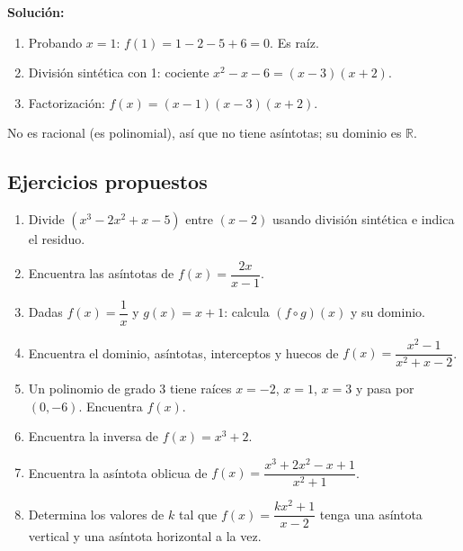 \documentclass[12pt, a4paper]{article}
\begin{document}
\begin{cuadrosolucion}
  \textbf{Solución:}
  \begin{enumerate}
    \item Probando $x = 1$: $f(1) = 1 - 2 - 5 + 6 = 0$. Es raíz.
    \item División sintética con 1: cociente $x^2 - x - 6 = (x - 3)(x + 2)$.
    \item Factorización: $f(x) = (x - 1)(x - 3)(x + 2)$.
  \end{enumerate}
  No es racional (es polinomial), así que no tiene asíntotas; su dominio es $\mathbb{R}$.
\end{cuadrosolucion}

\subsection{Ejercicios propuestos}

\begin{enumerate}[leftmargin=*, resume]
  \item \facil{} Divide $(x^3 - 2x^2 + x - 5)$ entre $(x - 2)$ usando división sintética e indica el residuo.

  \item \facil{} Encuentra las asíntotas de $f(x) = \dfrac{2x}{x - 1}$.

  \item \facil{} Dadas $f(x) = \dfrac{1}{x}$ y $g(x) = x + 1$: calcula $(f \circ g)(x)$ y su dominio.

  \item \medio{} Encuentra el dominio, asíntotas, interceptos y huecos de $f(x) = \dfrac{x^2 - 1}{x^2 + x - 2}$.

  \item \medio{} Un polinomio de grado 3 tiene raíces $x = -2$, $x = 1$, $x = 3$ y pasa por $(0, -6)$. Encuentra $f(x)$.

  \item \medio{} Encuentra la inversa de $f(x) = x^3 + 2$.

  \item \dificil{} Encuentra la asíntota oblicua de $f(x) = \dfrac{x^3 + 2x^2 - x + 1}{x^2 + 1}$.

  \item \dificil{} Determina los valores de $k$ tal que $f(x) = \dfrac{kx^2 + 1}{x - 2}$ tenga una asíntota vertical y una asíntota horizontal a la vez.
\end{enumerate}

\newpage
\end{document}
